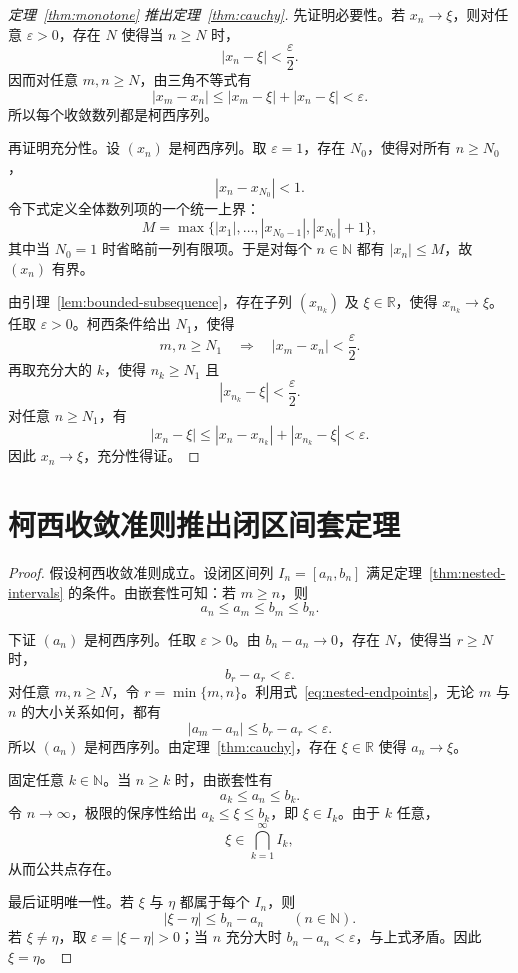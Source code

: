 \documentclass[UTF8,12pt,a4paper,fontset=fandol]{ctexart}
\begin{document}
\begin{proof}[定理~\ref{thm:monotone} 推出定理~\ref{thm:cauchy}]
  先证明必要性。若 $x_n\to\xi$，则对任意 $\varepsilon>0$，存在 $N$ 使得当 $n\geq N$ 时，
  \[
    |x_n-\xi|<\frac{\varepsilon}{2}.
  \]
  因而对任意 $m,n\geq N$，由三角不等式有
  \[
    |x_m-x_n|
    \leq |x_m-\xi|+|x_n-\xi|
    <\varepsilon.
  \]
  所以每个收敛数列都是柯西序列。

  再证明充分性。设 $(x_n)$ 是柯西序列。取 $\varepsilon=1$，存在 $N_0$，使得对所有 $n\geq N_0$，
  \[
    |x_n-x_{N_0}|<1.
  \]
  令下式定义全体数列项的一个统一上界：
  \nopagebreak[4]
  \[
    M=\max\bigl\{|x_1|,\ldots,|x_{N_0-1}|,|x_{N_0}|+1\bigr\},
  \]
  其中当 $N_0=1$ 时省略前一列有限项。于是对每个 $n\in\mathbb N$ 都有 $|x_n|\leq M$，故 $(x_n)$ 有界。

  由引理~\ref{lem:bounded-subsequence}，存在子列 $(x_{n_k})$ 及 $\xi\in\mathbb R$，使得 $x_{n_k}\to\xi$。任取 $\varepsilon>0$。柯西条件给出 $N_1$，使得
  \[
    m,n\geq N_1\quad\Longrightarrow\quad
    |x_m-x_n|<\frac{\varepsilon}{2}.
  \]
  再取充分大的 $k$，使得 $n_k\geq N_1$ 且
  \[
    |x_{n_k}-\xi|<\frac{\varepsilon}{2}.
  \]
  对任意 $n\geq N_1$，有
  \[
    |x_n-\xi|
    \leq |x_n-x_{n_k}|+|x_{n_k}-\xi|
    <\varepsilon.
  \]
  因此 $x_n\to\xi$，充分性得证。
\end{proof}

\section{柯西收敛准则推出闭区间套定理}

\begin{proof}
  假设柯西收敛准则成立。设闭区间列 $I_n=[a_n,b_n]$ 满足定理~\ref{thm:nested-intervals} 的条件。由嵌套性可知：若 $m\geq n$，则
  \begin{equation}
    a_n\leq a_m\leq b_m\leq b_n.
    \label{eq:nested-endpoints}
  \end{equation}

  下证 $(a_n)$ 是柯西序列。任取 $\varepsilon>0$。由 $b_n-a_n\to0$，存在 $N$，使得当 $r\geq N$ 时，
  \[
    b_r-a_r<\varepsilon.
  \]
  对任意 $m,n\geq N$，令 $r=\min\{m,n\}$。利用式~\eqref{eq:nested-endpoints}，无论 $m$ 与 $n$ 的大小关系如何，都有
  \[
    |a_m-a_n|\leq b_r-a_r<\varepsilon.
  \]
  所以 $(a_n)$ 是柯西序列。由定理~\ref{thm:cauchy}，存在 $\xi\in\mathbb R$ 使得 $a_n\to\xi$。

  固定任意 $k\in\mathbb N$。当 $n\geq k$ 时，由嵌套性有
  \[
    a_k\leq a_n\leq b_k.
  \]
  令 $n\to\infty$，极限的保序性给出 $a_k\leq\xi\leq b_k$，即 $\xi\in I_k$。由于 $k$ 任意，
  \[
    \xi\in\bigcap_{k=1}^{\infty}I_k,
  \]
  从而公共点存在。

  最后证明唯一性。若 $\xi$ 与 $\eta$ 都属于每个 $I_n$，则
  \[
    |\xi-\eta|\leq b_n-a_n\qquad(n\in\mathbb N).
  \]
  若 $\xi\ne\eta$，取 $\varepsilon=|\xi-\eta|>0$；当 $n$ 充分大时 $b_n-a_n<\varepsilon$，与上式矛盾。因此 $\xi=\eta$。
\end{proof}
\end{document}
